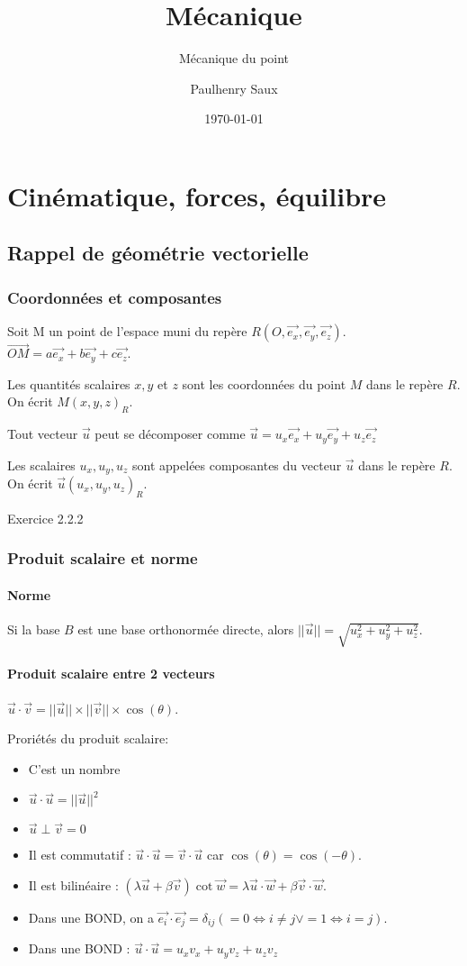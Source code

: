 \documentclass[french]{yLectureNote}
\title{Mécanique}
\subtitle{Mécanique du point}
\author{Paulhenry Saux}
\date{\today}
\renewcommand{\vec}{\overrightarrow}
\begin{document}
\setcounter{chapter}{1}
	\chapter{Cinématique, forces, équilibre }

\section{Rappel de géométrie vectorielle}

\subsection{Coordonnées et composantes}
Soit M un point de l'espace muni du repère $R(O,\vec{e_x}, \vec{e_y},\vec{e_z})$. $\vec{OM} = a\vec{e_x}+ b\vec{e_y}+c\vec{e_z}$.

Les quantités scalaires $x,y$ et $z$ sont les coordonnées du point $M$ dans le repère $R$. On écrit $M(x,y,z)_R$.

Tout vecteur $\vec{u}$ peut se décomposer comme $\vec{u} = u_x\vec{e_x}+ u_y\vec{e_y}+u_z\vec{e_z}$

Les scalaires $u_x,u_y,u_z$ sont appelées composantes du vecteur $\vec{u}$ dans le repère $R$. On écrit $\vec{u} (u_x,u_y,u_z)_R$.

Exercice 2.2.2

\subsection{Produit scalaire et norme}
\subsubsection{Norme}
Si la base $B$ est une base orthonormée directe, alors $||\vec{u}|| = \sqrt{u_x^2+u_y^2+u_z^2}$.
\subsubsection{Produit scalaire entre 2 vecteurs}

\begin{theorem}[Définition]
$\vec{u}\cdot\vec{v} = ||\vec{u}||\times||\vec{v}|| \times \cos(\theta)$.
\end{theorem}
Proriétés du produit scalaire:

\begin{itemize}
 \item C'est un nombre
 \item $\vec{u}\cdot\vec{u} = ||\vec{u}||^2$
 \item $ \vec{u} \perp  \vec{v} = 0$
 \item Il est commutatif : $\vec{u}\cdot\vec{u} = \vec{v}\cdot\vec{u}$ car $\cos(\theta) = \cos(-\theta)$.
 \item Il est bilinéaire : $(\lambda \vec{u}+\beta \vec{v})\cot \vec{w} = \lambda \vec{u}\cdot \vec{w} + \beta \vec{v}\cdot \vec{w}$.
 \item Dans une BOND, on a $\vec{e_i}\cdot\vec{e_j} = \delta_{ij} (= 0 \iff i\neq j \vee = 1 \iff i=j)$.
 \item Dans une BOND : $\vec{u}\cdot\vec{u} = u_xv_x + u_yv_z+u_zv_z$
\end{itemize}
\end{document}
